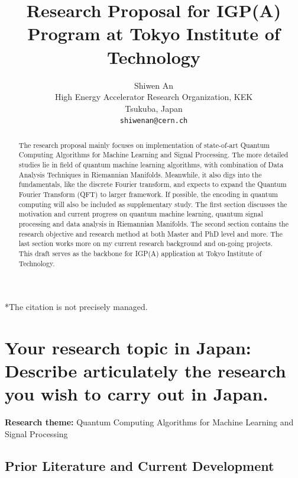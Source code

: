 \documentclass{article}
\title{Research Proposal for IGP(A) Program at Tokyo 
Institute of Technology}
\author{
 Shiwen An \\
 High Energy Accelerator Research Organization, KEK \\
  Tsukuba, Japan \\
  \texttt{shiwenan@cern.ch} \\
}
\begin{document}
\maketitle
\begin{abstract}
The research proposal mainly focuses on implementation of 
state-of-art Quantum Computing Algorithms for Machine Learning 
and Signal Processing. The more detailed 
studies lie in field of quantum machine learning algorithms, with combination 
of Data Analysis Techniques in Riemannian Manifolds. Meanwhile, it also
digs into the fundamentals, like the discrete Fourier transform, and expects 
to expand the Quantum Fourier Transform (QFT) to larger framework. If possible, 
the encoding in quantum computing will also be included as supplementary 
study. The first section discusses the motivation and current progress on 
quantum machine learning, quantum signal processing and data analysis 
in Riemannian Manifolds. The second section contains 
the research objective and research method at both Master and PhD level and more. 
The last section works more 
on my current research background and on-going projects. This draft
 serves as the backbone for IGP(A) application at Tokyo Institute of 
 Technology. 
\end{abstract}



*The citation is not precisely managed. 

\section{Your research topic in Japan:
Describe articulately the research you wish
to carry out in Japan.}

\textbf{Research theme:} Quantum Computing Algorithms for 
Machine Learning and Signal Processing

\subsection{Prior Literature and Current Development}
\end{document}
